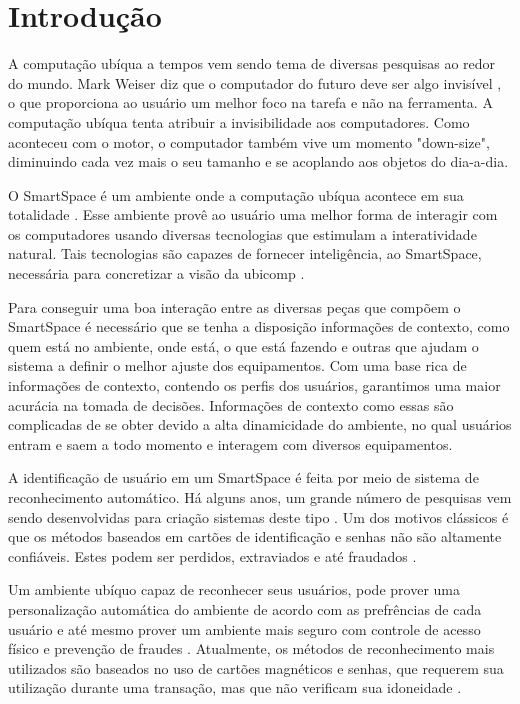 
\chapter{Introdução}
	
A computação ubíqua a tempos vem sendo tema de diversas pesquisas ao redor do mundo. Mark Weiser diz que o computador do futuro deve ser algo invisível \cite{weiser1} \cite{weiser2}, o que proporciona ao usuário um melhor foco na tarefa e não na ferramenta. A computação ubíqua tenta atribuir a invisibilidade aos computadores. Como aconteceu com o motor, o computador também vive um momento "down-size", diminuindo cada vez mais o seu tamanho e se acoplando aos objetos do dia-a-dia.

O SmartSpace é um ambiente onde a computação ubíqua acontece em sua totalidade \cite{gregoryabowd}. Esse ambiente provê ao usuário uma melhor forma de interagir com os computadores usando diversas tecnologias que estimulam a interatividade natural. Tais tecnologias são capazes de fornecer inteligência, ao SmartSpace, necessária para concretizar a visão da ubicomp \cite{fabriciobuzzeto}.

Para conseguir uma boa interação entre as diversas peças que compõem o SmartSpace é necessário que se tenha a disposição informações de contexto,  como quem está no ambiente, onde está, o que está fazendo e outras que ajudam o sistema a definir o melhor ajuste dos equipamentos. Com uma base rica de informações de contexto, contendo os perfis dos usuários, garantimos uma maior acurácia na tomada de decisões. Informações de contexto como essas são complicadas de se obter devido a alta dinamicidade do ambiente, no qual usuários entram e saem a todo momento e interagem com diversos equipamentos.

A identificação de usuário em um SmartSpace é feita por meio de sistema de reconhecimento automático. Há alguns anos, um grande número de pesquisas vem sendo desenvolvidas para criação sistemas deste tipo \cite{saocarlos}. Um dos motivos clássicos é que os métodos baseados em cartões de identificação e senhas não são altamente confiáveis. Estes podem ser perdidos, extraviados e até fraudados \cite{bolle}.

Um ambiente ubíquo capaz de reconhecer seus usuários, pode prover uma personalização automática do ambiente de acordo com as prefrências de cada usuário e até mesmo prover um ambiente mais seguro com controle de acesso físico e prevenção de fraudes \cite{saocarlos}. Atualmente, os métodos de reconhecimento mais utilizados são baseados no uso de cartões magnéticos e senhas, que requerem sua utilização durante uma transação, mas que não verificam sua idoneidade \cite{daugman}.

